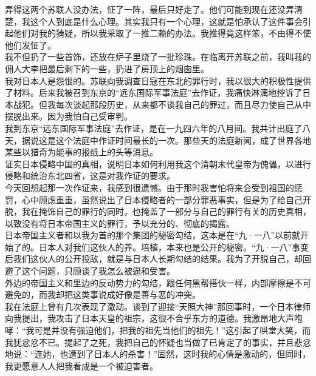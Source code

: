 弄得这两个苏联人没办法，怔了一阵，最后只好走了。他们可能到现在还没弄清楚，我这个人到底是什么心理。其实我只有一个心理，这就是怕承认了这件事会引起他们对我的猜疑，所以我采取了一推二赖的办法。我推得竟这样笨，不由得不使他们发怔了。\\

我不但扔了一些首饰，还放在炉子里烧了一批珍珠。在临离开苏联之前，我叫我的佣人大李把最后剩下的一些，扔进了房顶上的烟囱里。\\

我对日本人是怨恨的。苏联向我调查日寇在东北的罪行时，我以很大的积极性提供了材料。后来我被召到东京的“远东国际军事法庭”去作证，我痛快淋漓地控诉了日本战犯。但我每次谈起那段历史，从来都不谈我自己的罪过，而且尽力使自己从中摆脱出来。因为我怕自己受审判。\\

我到东京“远东国际军事法庭”去作证，是在一九四六年的八月间。我共计出庭了八天，据说这是这个法庭中作证时间最长的一次。那些天的法庭新闻，成了世界各地某些以猎奇为能事的报纸上的头等消息。\\

证实日本侵略中国的真相，说明日本如何利用我这个清朝末代皇帝为傀儡，以进行侵略和统治东北四省，这是对我作证的要求。\\

今天回想起那一次作证来，我感到很遗憾。由于那时我害怕将来会受到祖国的惩罚，心中顾虑重重，虽然说出了日本侵略者的一部分罪恶事实，但是为了给自己开脱，我在掩饰自己的罪行的同时，也掩盖了一部分与自己的罪行有关的历史真相，以致没有将日本帝国主义的罪行，予以充分的、彻底的揭露。\\

日本帝国主义者和以我为首的那个集团的秘密勾结，这本是在“九·一八”以前就开始了的。日本人对我们这伙人的养。培植，本来也是公开的秘密。“九·一八”事变后我们这伙人的公开投敌，就是与日本人长期勾结的结果。我为了开脱自己，却回避了这个问题，只顾谈了我怎么被逼和受害。\\

外边的帝国主义和里边的反动势力的勾结，跟任何黑帮搭伙一样，内部摩擦是不可避免的，而我却把这类事说成好像是善与恶的冲突。\\

我在法庭上曾有几次表现了激动。谈到了迎接“天照大神”那回事时，一个日本律师向我提出，我攻击了日本天皇的祖宗，这很不合乎东方的道德。我激昂地大声咆哮：“我可是并没有强迫他们，把我的祖先当他们的祖先！”这引起了哄堂大笑，而我犹忿忿不已。提起了之死，我把自己的怀疑也当做了已肯定了的事实，并且悲忿地说：“连她，也遭到了日本人的杀害！”固然，这时我的心情是激动的，但同时，我更愿意人人把我看成是一个被迫害者。\\

